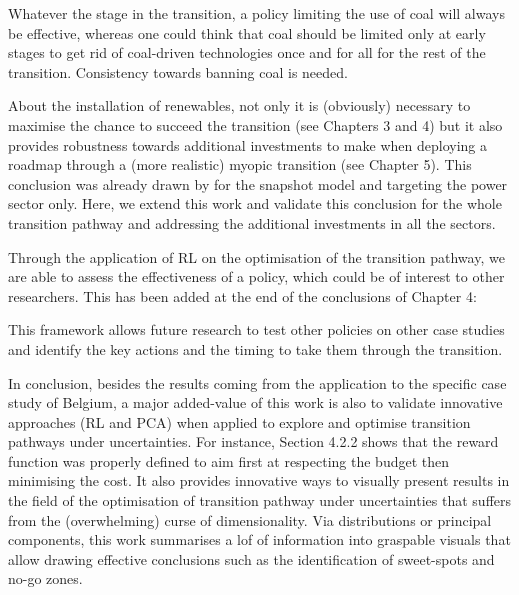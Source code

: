 \documentclass[12pt,a4paper]{article}
\begin{document}
\begin{mdframed}[style=manuscript] 
Whatever the stage in the transition, a policy limiting the use of coal will always be effective, whereas one could think that coal should be limited only at early stages to get rid of coal-driven technologies once and for all for the rest of the transition. Consistency towards banning coal is needed.
\end{mdframed}

About the installation of renewables, not only it is (obviously) necessary to maximise the chance to succeed the transition (see Chapters 3 and 4) but it also provides robustness towards additional investments to make when deploying a roadmap through a (more realistic) myopic transition (see Chapter 5). This conclusion was already drawn by \citet{moret2020overcapacity} for the snapshot model and targeting the power sector only. Here, we extend this work and validate this conclusion for the whole transition pathway and addressing the additional investments in all the sectors.

Through the application of RL on the optimisation of the transition pathway, we are able to assess the effectiveness of a policy, which could be of interest to other researchers. This has been added {\color{blue}at the end of the conclusions of Chapter 4}:

\begin{mdframed}[style=manuscript] 
This framework allows future research to test other policies on other case studies and identify the key actions and the timing to take them through the transition.
\end{mdframed}

In conclusion, besides the results coming from the application to the specific case study of Belgium, a major added-value of this work is also to validate innovative approaches (RL and PCA) when applied to explore and optimise transition pathways under uncertainties. For instance, Section 4.2.2 shows that the reward function was properly defined to aim first at respecting the  budget then minimising the cost. It also provides innovative ways to visually present results in the field of the optimisation of transition pathway under uncertainties that suffers from the (overwhelming) curse of dimensionality. Via distributions or principal components, this work summarises a lof of information into graspable visuals that allow drawing effective conclusions such as the identification of sweet-spots and no-go zones.
\end{document}
